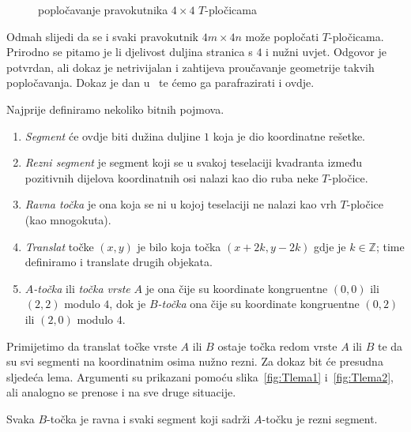 \documentclass[11pt]{scrartcl}
\begin{document}
\begin{figure}[ht]
\centering
{}
\caption{popločavanje pravokutnika $4 \times 4$ $T$-pločicama}
\label{fig:4times4}
\end{figure}

\noindent Odmah slijedi da se i svaki pravokutnik $4m \times 4n$ može popločati $T$-pločicama. Prirodno se pitamo je li djelivost duljina stranica s $4$ i nužni uvjet. Odgovor je potvrdan, ali dokaz je netrivijalan i zahtijeva proučavanje geometrije takvih popločavanja. Dokaz je dan u~\cite{walkup} te ćemo ga parafrazirati i ovdje.
\begin{definicija} Najprije definiramo nekoliko bitnih pojmova.
\begin{enumerate}
\item \emph{Segment} će ovdje biti dužina duljine $1$ koja je dio koordinatne rešetke.
\item \emph{Rezni segment} je segment koji se u svakoj teselaciji kvadranta između pozitivnih dijelova koordinatnih osi nalazi kao dio ruba neke $T$-pločice.
\item \emph{Ravna točka} je ona koja se ni u kojoj teselaciji ne nalazi kao vrh $T$-pločice (kao mnogokuta).
\item \emph{Translat} točke $(x,y)$ je bilo koja točka $(x + 2k, y - 2k)$ gdje je $k \in \mathbb{Z}$; time definiramo i translate drugih objekata.
\item $A$\emph{-točka} ili \emph{točka vrste} $A$ je ona čije su koordinate kongruentne $(0,0)$ ili $(2,2)$ modulo $4$, dok je $B$\emph{-točka} ona čije su koordinate kongruentne $(0,2)$ ili $(2,0)$ modulo $4$.
\end{enumerate}
\end{definicija}

\noindent Primijetimo da translat točke vrste $A$ ili $B$ ostaje točka redom vrste $A$ ili $B$ te da su svi segmenti na koordinatnim osima nužno rezni. Za dokaz bit će presudna sljedeća lema. Argumenti su prikazani pomoću slika~\ref{fig:Tlema1} i~\ref{fig:Tlema2}, ali analogno se prenose i na sve druge situacije.

\begin{lema} \label{Tlema}
Svaka $B$-točka je ravna i svaki segment koji sadrži $A$-točku je rezni segment.
\end{lema}
\end{document}
